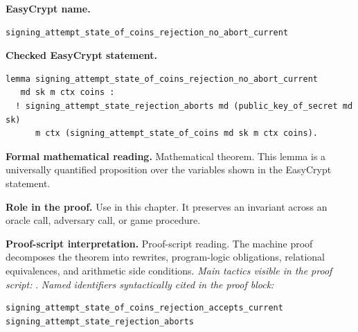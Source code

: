 \begin{formaltheorem}
\noindent\textbf{EasyCrypt name.}
\begin{lstlisting}[language=EasyCrypt,basicstyle=\ttfamily\scriptsize]
signing_attempt_state_of_coins_rejection_no_abort_current
\end{lstlisting}
\noindent\textbf{Checked EasyCrypt statement.}
\begin{lstlisting}[language=EasyCrypt,basicstyle=\ttfamily\scriptsize]
lemma signing_attempt_state_of_coins_rejection_no_abort_current
   md sk m ctx coins :
  ! signing_attempt_state_rejection_aborts md (public_key_of_secret md sk)
      m ctx (signing_attempt_state_of_coins md sk m ctx coins).
\end{lstlisting}
\noindent\textbf{Formal mathematical reading.}
Mathematical theorem. This lemma is a universally quantified proposition over the variables shown in the EasyCrypt statement.

\noindent\textbf{Role in the proof.}
Use in this chapter. It preserves an invariant across an oracle call, adversary call, or game procedure.

\noindent\textbf{Proof-script interpretation.}
Proof-script reading. The machine proof decomposes the theorem into rewrites, program-logic obligations, relational equivalences, and arithmetic side conditions.
\emph{Main tactics visible in the proof script:} .
\emph{Named identifiers syntactically cited in the proof block:}
\begin{lstlisting}[language=EasyCrypt,basicstyle=\ttfamily\scriptsize]
signing_attempt_state_of_coins_rejection_accepts_current
signing_attempt_state_rejection_aborts
\end{lstlisting}

\end{formaltheorem}

